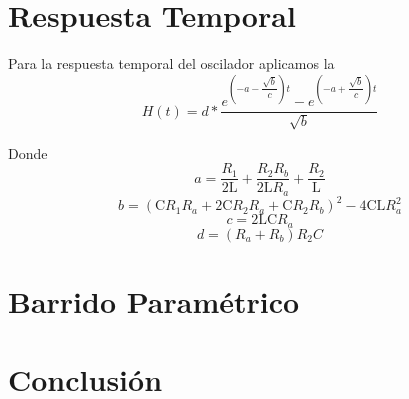 \documentclass[10pt,a4paper]{article} %
\begin{document}
\section{Respuesta Temporal}
Para la respuesta temporal del oscilador aplicamos la %
\begin{equation}
H(t)=d*\dfrac{e^{(-a-\dfrac{\sqrt{b}}{c})t}-e^{(-a+\dfrac{\sqrt{b}}{c})t}}{\sqrt{b}}
\end{equation}

Donde 
\begin{equation}
a=\frac{R_{1}}{2 \text{L}}+\frac{R_{2} R_{b}}{2 \text{L} R_{a}}+\frac{R_{2}}{\text{L}}
\end{equation}
\begin{equation}
b=(\text{C} R_{1} R_{a} +2 \text{C} R_{2} R_{a} +\text{C} R_{2} R_{b})^2-4 \text{C} \text{L} R_{a}^2
\end{equation}
\begin{equation}
c=2 \text{L} \text{C} R_{a}
\end{equation}
\begin{equation}
d= (R_{a}+R_{b})R_{2}C
\end{equation}



\section{Barrido Paramétrico}
\section{Conclusión}
\end{document}
